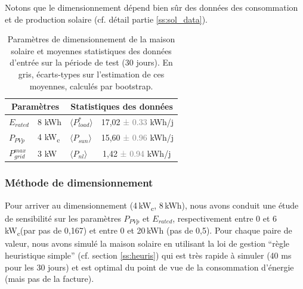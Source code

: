 \documentclass[a4paper,10pt,twocolumn]{article}
\providecommand{\avg}[1]{\langle#1\rangle}
\newcommand\sub[1]{\textsubscript{#1}}
\newcommand\kWc{kW\sub{c}{}} %
\providecommand{\deta}[1]{\textcolor{gray}{#1}}
\begin{document}
Notons que le dimensionnement dépend bien sûr des données
des consommation et de production solaire (cf. détail partie \ref{ss:sol_data}).

\begin{table}[!h]
\renewcommand{\arraystretch}{1.2}

\caption{Paramètres de dimensionnement de la maison solaire
et moyennes statistiques des données d'entrée sur la période de test
(30 jours).
En gris, écarts-types sur l'estimation de ces moyennes,
calculés par bootstrap.}
\label{tab:dim_stats}

\noindent
\centering
  \begin{center}
    \begin{tabular}{l l l l}
      \toprule
      \multicolumn{2}{c}{Paramètres} & \multicolumn{2}{c}{Statistiques des données} \\
      \midrule
      $E_{rated}$       & 8 kWh  & $\avg{P_{load}^*}$ &    17,02 \deta{± 0.33} kWh/j\\
      $P_{PVp}$         & 4 \kWc  & $\avg{P_{sun}}$    &    15,60 \deta{± 0.96} kWh/j\\
      $P_{grid}^{max}$  & 3 kW   & $\avg{P_{nl}}$     & \;\,1,42 \deta{± 0.94} kWh/j\\
      \bottomrule
    \end{tabular}
  \end{center}
\end{table}

\subsubsection{Méthode de dimensionnement}

Pour arriver au dimensionnement (4\,\kWc, 8\,kWh), nous avons conduit une étude
de sensibilité sur les paramètres $P_{PVp}$ et $E_{rated}$, respectivement
entre 0 et 6\,\kWc (par pas de 0,167) et entre 0 et 20\,kWh (pas de 0,5).
Pour chaque paire de valeur, nous avons simulé la maison solaire
en utilisant la loi de gestion ``règle heuristique simple'' (cf. section \ref{ss:heuris})
qui est très rapide à simuler (40 ms pour les 30 jours) et est optimal
du point de vue de la consommation d'énergie (mais pas de la facture).
\end{document}
